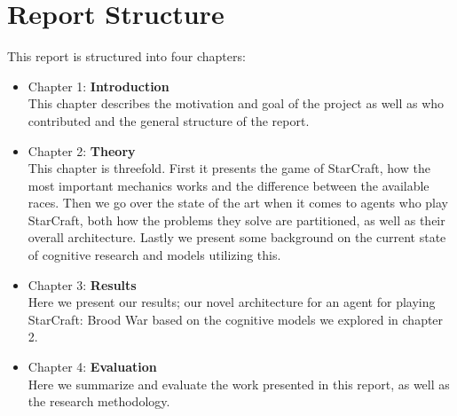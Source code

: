 \section{Report Structure}
\label{sec:structure}
This report is structured into four chapters:
\begin{itemize}
\item Chapter 1: \textbf{Introduction} \\
This chapter describes the motivation and goal of the project as well as who
contributed and the general structure of the report.
\item Chapter 2: \textbf{Theory} \\
This chapter is threefold. First it presents the game of StarCraft, how the most
important mechanics works and the difference between the
available races. Then we go over the state of the art when it comes to agents
who play StarCraft, both how the problems they solve are partitioned, as well
as their overall architecture. Lastly we present some background on the current state of cognitive research and models
utilizing this.
\item Chapter 3: \textbf{Results} \\
Here we present our results; our novel architecture for an agent for playing
StarCraft: Brood War based on the cognitive models we explored in chapter 2.
\item Chapter 4: \textbf{Evaluation} \\
Here we summarize and evaluate the work presented in this report, as well as the research methodology.

\end{itemize}